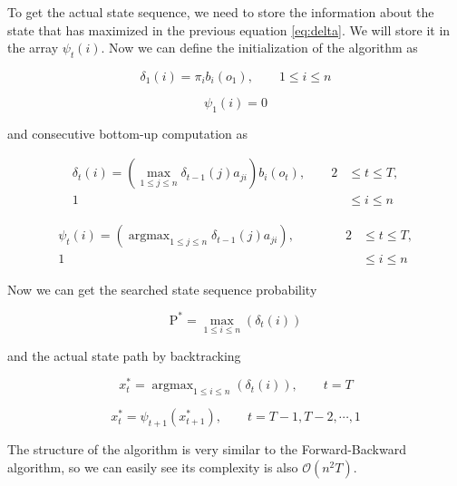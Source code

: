 \documentclass[thesis=M,english]{FITthesis}[2012/10/20]
\newcommand{\argmax}{\mathop{\mathrm{argmax}}}
\begin{document}
To get the actual state sequence, we need to store the information about the state that has maximized in the previous equation \eqref{eq:delta}. We will store it in the array $\psi_t(i)$. Now we can define the initialization of the algorithm as

\begin{equation}
\delta_1(i) = \pi_i b_i(o_1), \qquad 1 \leq i \leq n 
\end{equation}

\begin{equation}
\psi_1(i) = 0 
\end{equation}

and consecutive bottom-up computation as

\begin{equation}
\begin{aligned}
\delta_{t}(i) = ( \max_{ 1 \leq j \leq n } \delta_{t-1}(j)a_{ji} ) b_i(o_{t}), \qquad 2& \leq t \leq T, \\
																					   1& \leq i \leq n
\end{aligned}
\end{equation}

\begin{equation}
\begin{aligned}
\psi_{t}(i) = ( \argmax_{ 1 \leq j \leq n } \delta_{t-1}(j)a_{ji} ), \qquad \qquad 2& \leq t \leq T, \\
																			       1& \leq i \leq n
\end{aligned}
\end{equation}

Now we can get the searched state sequence probability 

\begin{equation}
\mathrm{P}^* = \max_{1 \leq i \leq n} ( \delta_{t}(i) )  
\end{equation}

and the actual state path by backtracking

\begin{equation}
x_t^* = \argmax_{1 \leq i \leq n} ( \delta_{t}(i) ),  \qquad t = T  
\end{equation}

\begin{equation}
x_t^* = \psi_{t+1}(x_{t+1}^*), \qquad t = T-1, T-2, \cdots, 1  
\end{equation}

The structure of the algorithm is very similar to the Forward-Backward algorithm, so we can easily see its complexity is also $\mathcal{O}(n^2T)$.
\end{document}
